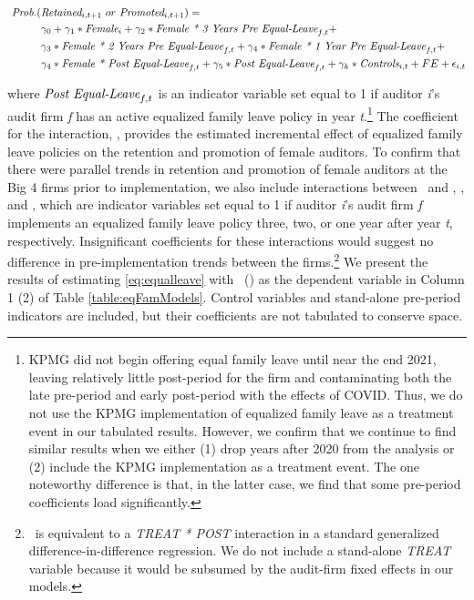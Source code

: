 \documentclass[11pt]{article}
\begin{document}
                \begin{align}\label{eq:equalleave}
                    \textit{ Prob.}(&\RETAINED_{i,t+1}\ or\ \PROMOTED_{i,t+1})=  \\ 
                                    &\gamma_0+\gamma_1*\FEMALE_{i}+\gamma_2*\FEMALExPREEQTHREE_{f,t}+\nonumber \\
                                    &\gamma_3*\FEMALExPREEQTWO_{f,t}+\gamma_4*\FEMALExPREEQONE_{f,t}+ \nonumber \\
                                    &\gamma_4*\FEMALExPOSTEQ_{f,t}+\gamma_5*\POSTEQ_{f,t}+\gamma_k*\textit{Controls}_{i,t}+FE+\epsilon_{i,t}\nonumber
                \end{align}
    
            \noindent where $\textit{Post Equal-Leave}_{f,t}$ is an indicator variable set equal to 1 if auditor \textit{i}'s audit firm \textit{f} has an active equalized family leave policy in year \textit{t}.\footnote{KPMG did not begin offering equal family leave until near the end 2021, leaving relatively little post-period for the firm and contaminating both the late pre-period and early post-period with the effects of COVID. Thus, we do not use the KPMG implementation of equalized family leave as a treatment event in our tabulated results. However, we confirm that we continue to find similar results when we either (1) drop years after 2020 from the analysis or (2) include the KPMG implementation as a treatment event. The one noteworthy difference is that, in the latter case, we find that some pre-period coefficients load significantly.} The coefficient for the interaction, \FEMALExPOSTEQ, provides the estimated incremental effect of equalized family leave policies on the retention and promotion of female auditors. To confirm that there were parallel trends in retention and promotion of female auditors at the Big 4 firms prior to implementation, we also include interactions between \FEMALE\ and \PREEQTHREE, \PREEQTWO, and \PREEQONE, which are indicator variables set equal to 1 if auditor \textit{i}'s audit firm \textit{f} implements an equalized family leave policy three, two, or one year after year \textit{t}, respectively. Insignificant coefficients for these interactions would suggest no difference in pre-implementation trends between the firms.\footnote{\POSTEQ\ is equivalent to a \textit{TREAT * POST} interaction in a standard generalized difference-in-difference regression. We do not include a stand-alone \textit{TREAT} variable because it would be subsumed by the audit-firm fixed effects in our models.} We present the results of estimating \ref{eq:equalleave} with \RETAINED\ (\PROMOTED) as the dependent variable in Column 1 (2) of Table \ref{table:eqFamModels}.  Control variables and stand-alone pre-period indicators are included, but their coefficients are not tabulated to conserve space. 
    
\end{document}
